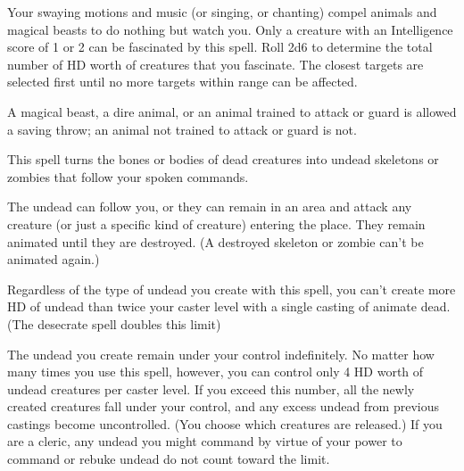 \begin{multicols}{2}
\begin{small}
\noindent Your swaying motions and music (or singing, or chanting) compel animals and magical beasts to do nothing but watch you. Only a creature with an Intelligence score of 1 or 2 can be fascinated by this spell. Roll 2d6 to determine the total number of HD worth of creatures that you fascinate. The closest targets are selected first until no more targets within range can be affected.

\smallskip\noindent A magical beast, a dire animal, or an animal trained to attack or guard is allowed a saving throw; an animal not trained to attack or guard is not.

\noindent This spell turns the bones or bodies of dead creatures into undead skeletons or zombies that follow your spoken commands.

\smallskip\noindent The undead can follow you, or they can remain in an area and attack any creature (or just a specific kind of creature) entering the place. They remain animated until they are destroyed. (A destroyed skeleton or zombie can't be animated again.)

\smallskip\noindent Regardless of the type of undead you create with this spell, you can't create more HD of undead than twice your caster level with a single casting of animate dead. (The desecrate spell doubles this limit)

\smallskip\noindent The undead you create remain under your control indefinitely. No matter how many times you use this spell, however, you can control only 4 HD worth of undead creatures per caster level. If you exceed this number, all the newly created creatures fall under your control, and any excess undead from previous castings become uncontrolled. (You choose which creatures are released.) If you are a cleric, any undead you might command by virtue of your power to command or rebuke undead do not count toward the limit. 


\end{small}
\end{multicols}
